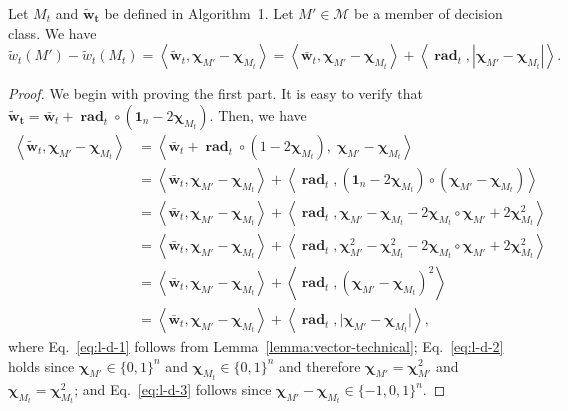 \documentclass{article}
\newcommand{\junk}[1]{}
\newcommand{\M}{\mathcal M}
\DeclareMathOperator{\rad}{rad}
\DeclareMathOperator*{\argmax}{arg\,max}
\newcommand{\inn}[1]{\left\langle #1 \right\rangle}
\renewcommand{\vec}[1]{\boldsymbol{#1}}
\renewcommand{\odot}{\circ}
\begin{document}
\begin{lemma}
Let $M_t$ and $\vec{\tilde w_t}$ be defined in Algorithm~1. 
Let $M' \in \M$ be a member of decision class.
We have
$$
\tilde w_t(M')-\tilde w_t(M_t) = 
\inn{\vec{\tilde w}_t, \vec \chi_{M'}-\vec \chi_{M_t}} = \inn{\vec {\bar w}_t, \vec \chi_{M'}-\vec\chi_{M_t}}+\inn{\vec \rad_t, |\vec \chi_{M'}-\vec\chi_{M_t}|}.
$$
\label{lemma:tilde}
\end{lemma}

\begin{proof}
We begin with proving the first part.
It is easy to verify that $\vec {\tilde w_t} = \vec {\bar w}_t+ \vec \rad_t \odot (\vec 1_n-2\vec\chi_{M_t})$.
Then, we have
\begin{align}
\inn{\vec{\tilde w}_t, \vec \chi_{M'}-\vec \chi_{M_t}}
&= \inn{\vec {\bar w}_t+ \vec \rad_t \odot (1-2\vec\chi_{M_t}), \;\vec \chi_{M'}-\vec \chi_{M_t}} \nonumber \\
&= \inn{\vec {\bar w}_t,\vec \chi_{M'}-\vec \chi_{M_t}}+\inn{\vec \rad_t, (\vec 1_n-2\vec\chi_{M_t}) \odot (\vec \chi_{M'}-\vec \chi_{M_t})}
\label{eq:l-d-1}\\
&= \inn{\vec {\bar w}_t,\vec \chi_{M'}-\vec \chi_{M_t}}+\inn{\vec \rad_t, \vec\chi_{M'}-\vec\chi_{M_t}-2\vec\chi_{M_t}\odot\vec\chi_{M'}+2\vec\chi_{M_t}^2 } \nonumber\\
&= \inn{\vec {\bar w}_t,\vec \chi_{M'}-\vec \chi_{M_t}}+\inn{\vec \rad_t, \vec\chi_{M'}^2-\vec\chi_{M_t}^2-2\vec\chi_{M_t}\odot\vec\chi_{M'}+2\vec\chi_{M_t}^2 }
\label{eq:l-d-2}\\
&= \inn{\vec {\bar w}_t,\vec \chi_{M'}-\vec \chi_{M_t}}+\inn{\vec \rad_t, (\vec\chi_{M'}-\vec\chi_{M_t})^2}
\nonumber \\ \
&= \inn{\vec {\bar w}_t,\vec \chi_{M'}-\vec \chi_{M_t}}+\inn{\vec \rad_t, \big|\vec\chi_{M'}-\vec\chi_{M_t}\big|},
\label{eq:l-d-3}
\end{align}
where
Eq.~\eqref{eq:l-d-1} follows from Lemma~\ref{lemma:vector-technical};
Eq.~\eqref{eq:l-d-2} holds since $\vec \chi_{M'}\in \{0,1\}^n$ and $\vec \chi_{M_t}\in \{0,1\}^n$
and therefore $\vec\chi_{M'}=\vec\chi_{M'}^2$ and $\vec\chi_{M_t}=\vec\chi_{M_t}^2$;
and Eq.~\eqref{eq:l-d-3} follows since $\vec\chi_{M'}-\vec\chi_{M_t}\in \{-1,0,1\}^n$.
\junk{
Next, recall that $\tilde M_t = \argmax_{M\in \M} \tilde w_t(M)$.
Therefore, we have $\tilde w_t(\tilde M_t) \ge \tilde w_t(M')$.
Subtracting $\tilde w_t(M_t)$ from both sides of the former inequality, we have
\begin{equation}
\tilde w_t(\tilde M_t)-\tilde w_t(M_t) \ge \tilde w_t(M')-\tilde w_t(M_t).
\label{eq:l-d-4}
\end{equation}
The lemma follows by noticing that the left-hand side of Eq.~\eqref{eq:l-d-4} equals to 
$\inn{\vec {\bar w}_t,\vec \chi_{\tilde M_t}-\vec \chi_{M_t}}+\inn{\vec \rad_t, \big|\vec\chi_{\tilde M_t}-\vec\chi_{M_t}\big|}$
and the right-hand side equals to
$\inn{\vec {\bar w}_t,\vec \chi_{M'}-\vec \chi_{M_t}}+\inn{\vec \rad_t, \big|\vec\chi_{M'}-\vec\chi_{M_t}\big|}$.
}
\end{proof}
\end{document}
